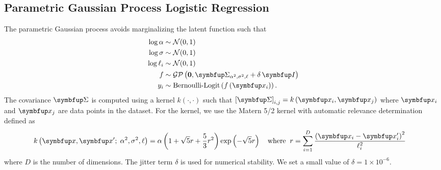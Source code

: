 \subsection{Parametric Gaussian Process Logistic Regression}\label{section:gp_logistic}
The parametric Gaussian process avoids marginalizing the latent function such that
\begin{align*}
   \log \alpha &\sim \mathcal{N}(0, 1) \\
   \log \sigma &\sim \mathcal{N}(0, 1) \\
   \log \ell_i &\sim \mathcal{N}(0, 1) \\
   f &\sim \mathcal{GP}\left(\mathbf{0}, \mSigma_{\alpha^2, \sigma^2, \mathbf{\ell}} + \delta\,\mI \right) \\
   y_i &\sim \text{Bernoulli-Logit}\left(  f\left( \vx_i \right) \right).
\end{align*}
The covariance \(\mSigma\) is computed using a kernel \(k\left(\cdot, \cdot\right)\) such that \({[\mSigma]}_{i,j} = k\left( \vx_{i}, \vx_{j} \right) \) where \(\vx_i\) and \(\vx_j\) are data points in the dataset.
For the kernel, we use the Matern 5/2 kernel with automatic relevance determination~\citep{neal_bayesian_1996} defined as
\begin{align*}
  &k\left(\vx, \vx' ;\; \alpha^2, \sigma^2, \mathbf{\ell} \right) =
  \alpha \left( 1 + \sqrt{5} r + \frac{5}{3} r^2 \right) \exp\left( - \sqrt{5} r \right)  \quad
  \text{where}\;\; r = \sum^{D}_{i=1} \frac{ {\left(\vx_i - \vx'_i\right)}^2 }{\ell^2_i}
\end{align*}
where \(D\) is the number of dimensions.
The jitter term \(\delta\) is used for numerical stability.
We set a small value of \(\delta = 1\times10^{-6}\).

